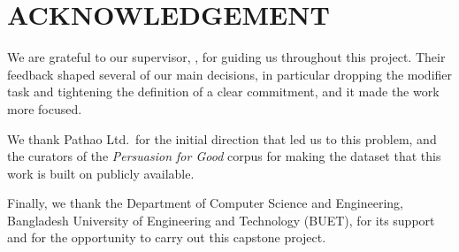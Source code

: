 \chapter*{ACKNOWLEDGEMENT}

We are grateful to our supervisor, \Supervisors, for guiding us throughout this project. Their feedback shaped several of our main decisions, in particular dropping the modifier task and tightening the definition of a clear commitment, and it made the work more focused.

We thank Pathao Ltd.\ for the initial direction that led us to this problem, and the curators of the \textit{Persuasion for Good} corpus \cite{wang2019persuasion} for making the dataset that this work is built on publicly available.

Finally, we thank the Department of Computer Science and Engineering, Bangladesh University of Engineering and Technology (BUET), for its support and for the opportunity to carry out this capstone project.

\clearpage
